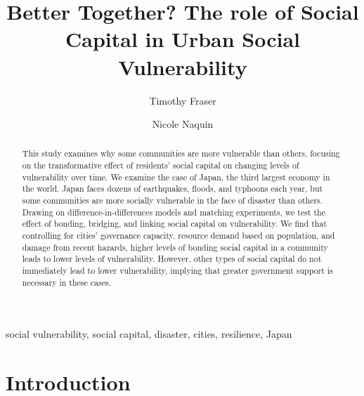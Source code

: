 \documentclass[]{elsarticle} %
\begin{document}
\begin{frontmatter}

  \title{Better Together? The role of Social Capital in Urban Social
Vulnerability}
    \author[Northeastern University]{Timothy Fraser}
    \author[Northeastern University]{Nicole Naquin}
      \address[Northeastern University]{Department of Political Science,
Northeastern University,\newline 960A Renaissance Park, 360 Huntington
Ave, Boston, MA, 02115}
  
  \begin{abstract}
  This study examines why some communities are more vulnerable than
  others, focusing on the transformative effect of residents' social
  capital on changing levels of vulnerability over time. We examine the
  case of Japan, the third largest economy in the world. Japan faces
  dozens of earthquakes, floods, and typhoons each year, but some
  communities are more socially vulnerable in the face of disaster than
  others. Drawing on difference-in-differences models and matching
  experiments, we test the effect of bonding, bridging, and linking
  social capital on vulnerability. We find that controlling for cities'
  governance capacity, resource demand based on population, and damage
  from recent hazards, higher levels of bonding social capital in a
  community leads to lower levels of vulnerability. However, other types
  of social capital do not immediately lead to lower vulnerability,
  implying that greater government support is necessary in these cases.
  \end{abstract}
   \begin{keyword} social vulnerability, social
capital, disaster, cities, resilience, Japan\end{keyword}
 \end{frontmatter}

\captionsetup[table]{labelformat=empty}
\captionsetup[figure]{labelformat=empty}

\hypertarget{introduction}{%
\section{Introduction}\label{introduction}}
\end{document}
